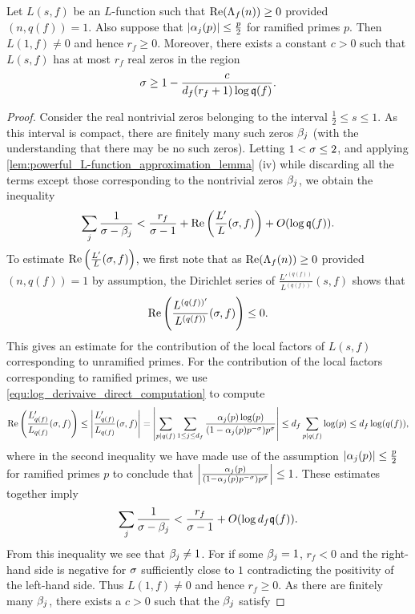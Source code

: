     \begin{lemma}\label{lem:non-vanshing_at_1_lemma}
      Let $L(s,f)$ be an $L$-function such that $\mathrm{Re}(\Lambda_{f}(n)) \ge 0$ provided $(n,q(f)) = 1$. Also suppose that $|\alpha_{j}(p)| \le \frac{p}{2}$ for ramified primes $p$. Then $L(1,f) \neq 0$ and hence $r_{f} \ge 0$. Moreover, there exists a constant $c > 0$ such that $L(s,f)$ has at most $r_{f}$ real zeros in the region
      \[
        \sigma \ge 1-\frac{c}{d_{f}(r_{f}+1)\log{\mathfrak{q}(f)}}.
      \]
    \end{lemma}
    \begin{proof}
      Consider the real nontrivial zeros belonging to the interval $\frac{1}{2} \le s \le 1$. As this interval is compact, there are finitely many such zeros $\beta_{j}$ (with the understanding that there may be no such zeros). Letting $1 < \sigma \le 2$, and applying \cref{lem:powerful_L-function_approximation_lemma} (iv) while discarding all the terms except those corresponding to the nontrivial zeros $\beta_{j}$, we obtain the inequality
      \[
        \sum_{j}\frac{1}{\sigma-\beta_{j}} < \frac{r_{f}}{\sigma-1}+\mathrm{Re}\left(\frac{L'}{L}(\sigma,f)\right)+O(\log{\mathfrak{q}(f)}).
      \]
      To estimate $\mathrm{Re}\left(\frac{L'}{L}(\sigma,f)\right)$, we first note that as $\mathrm{Re}(\Lambda_{f}(n)) \ge 0$ provided $(n,q(f)) = 1$ by assumption, the Dirichlet series of $\frac{L'^{(q(f))}}{L^{(q(f))}}(s,f)$ shows that
      \[
        \mathrm{Re}\left(\frac{L^{(q(f))'}}{L^{(q(f))}}(\sigma,f)\right) \le 0.
      \]
      This gives an estimate for the contribution of the local factors of $L(s,f)$ corresponding to unramified primes. For the contribution of the local factors corresponding to ramified primes, we use \cref{equ:log_derivaive_direct_computation} to compute
      \[
        \mathrm{Re}\left(\frac{L'_{q(f)}}{L_{q(f)}}(\sigma,f)\right) \le \left|\frac{L'_{q(f)}}{L_{q(f)}}(\sigma,f)\right| = \left|\sum_{p \mid q(f)}\sum_{1 \le j \le d_{f}}\frac{\alpha_{j}(p)\log(p)}{(1-\alpha_{j}(p)p^{-\sigma})p^{\sigma}}\right| \le d_{f}\sum_{p \mid q(f)}\log(p) \le d_{f}\log(q(f)),
      \]
      where in the second inequality we have made use of the assumption $|\alpha_{j}(p)| \le \frac{p}{2}$ for ramified primes $p$ to conclude that $\left|\frac{\alpha_{j}(p)}{(1-\alpha_{j}(p)p^{-\sigma})p^{\sigma}}\right| \le 1$. These estimates together imply
      \[
        \sum_{j}\frac{1}{\sigma-\beta_{j}} < \frac{r_{f}}{\sigma-1}+O(\log{d_{f}\mathfrak{q}(f)}).
      \]
      From this inequality we see that $\beta_{j} \neq 1$. For if some $\beta_{j} = 1$, $r_{f} < 0$ and the right-hand side is negative for $\sigma$ sufficiently close to $1$ contradicting the positivity of the left-hand side. Thus $L(1,f) \neq 0$ and hence $r_{f} \ge 0$. As there are finitely many $\beta_{j}$, there exists a $c > 0$ such that the $\beta_{j}$ satisfy

\end{proof}
